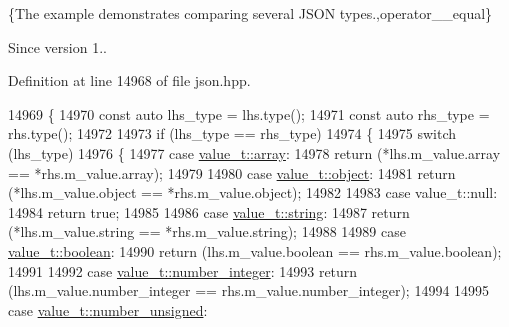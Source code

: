 \{The example demonstrates comparing several J\+S\+ON types.,operator\+\_\+\+\_\+equal\}

\begin{DoxySince}{Since}
version 1.. 
\end{DoxySince}


Definition at line 14968 of file json.\+hpp.


\begin{DoxyCode}
14969     \{
14970         \textcolor{keyword}{const} \textcolor{keyword}{auto} lhs\_type = lhs.type();
14971         \textcolor{keyword}{const} \textcolor{keyword}{auto} rhs\_type = rhs.type();
14972 
14973         \textcolor{keywordflow}{if} (lhs\_type == rhs\_type)
14974         \{
14975             \textcolor{keywordflow}{switch} (lhs\_type)
14976             \{
14977                 \textcolor{keywordflow}{case} \hyperlink{namespacenlohmann_1_1detail_a1ed8fc6239da25abcaf681d30ace4985af1f713c9e000f5d3f280adbd124df4f5}{value\_t::array}:
14978                     \textcolor{keywordflow}{return} (*lhs.m\_value.array == *rhs.m\_value.array);
14979 
14980                 \textcolor{keywordflow}{case} \hyperlink{namespacenlohmann_1_1detail_a1ed8fc6239da25abcaf681d30ace4985aa8cfde6331bd59eb2ac96f8911c4b666}{value\_t::object}:
14981                     \textcolor{keywordflow}{return} (*lhs.m\_value.object == *rhs.m\_value.object);
14982 
14983                 \textcolor{keywordflow}{case} value\_t::null:
14984                     \textcolor{keywordflow}{return} \textcolor{keyword}{true};
14985 
14986                 \textcolor{keywordflow}{case} \hyperlink{namespacenlohmann_1_1detail_a1ed8fc6239da25abcaf681d30ace4985ab45cffe084dd3d20d928bee85e7b0f21}{value\_t::string}:
14987                     \textcolor{keywordflow}{return} (*lhs.m\_value.string == *rhs.m\_value.string);
14988 
14989                 \textcolor{keywordflow}{case} \hyperlink{namespacenlohmann_1_1detail_a1ed8fc6239da25abcaf681d30ace4985a84e2c64f38f78ba3ea5c905ab5a2da27}{value\_t::boolean}:
14990                     \textcolor{keywordflow}{return} (lhs.m\_value.boolean == rhs.m\_value.boolean);
14991 
14992                 \textcolor{keywordflow}{case} \hyperlink{namespacenlohmann_1_1detail_a1ed8fc6239da25abcaf681d30ace4985a5763da164f8659d94a56e29df64b4bcc}{value\_t::number\_integer}:
14993                     \textcolor{keywordflow}{return} (lhs.m\_value.number\_integer == rhs.m\_value.number\_integer);
14994 
14995                 \textcolor{keywordflow}{case} \hyperlink{namespacenlohmann_1_1detail_a1ed8fc6239da25abcaf681d30ace4985adce7cc8ec29055c4158828921f2f265e}{value\_t::number\_unsigned}:

\end{DoxyCode}
